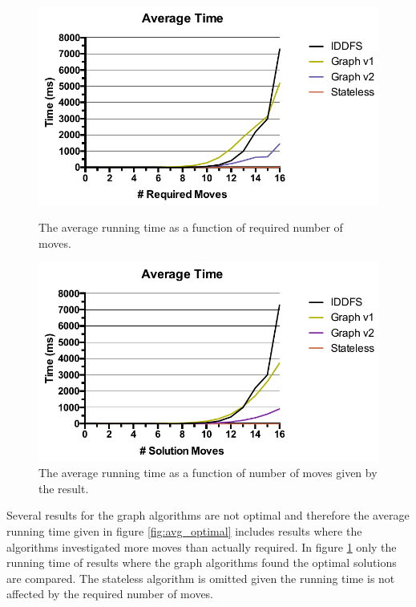 \documentclass[]{article}
\begin{document}
\begin{figure}[htb]
\centering
\begin{minipage}{0.45\linewidth}
\centering
\includegraphics{img/avg_optimal.pdf}
\caption{The average running time as a function of required number of moves.}
\label{fig:avg_optimal}
\end{minipage}
\quad
\begin{minipage}{0.45\linewidth}
\centering
\includegraphics{img/avg_solution.pdf}
\caption{The average running time as a function of number of moves given by the result.}
\label{fig:avg_solution}
\end{minipage}
\end{figure}

Several results for the graph algorithms are not optimal and therefore
the average running time given in figure \ref{fig:avg_optimal} includes
results where the algorithms investigated more moves than actually
required. In figure \ref{fig:avg_solution} only the running time of
results where the graph algorithms found the optimal solutions are
compared. The stateless algorithm is omitted given the running time is
not affected by the required number of moves.
\end{document}
